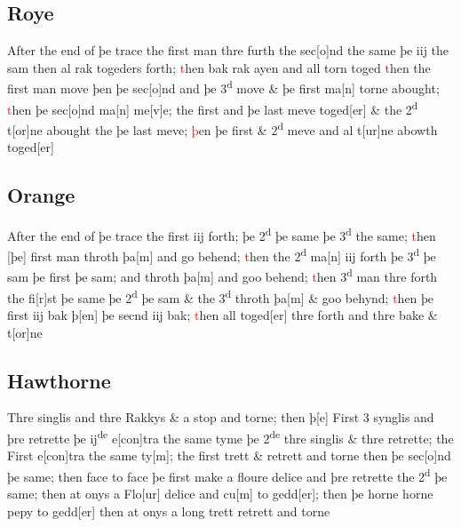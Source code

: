 \documentclass[12pt,letter]{article} %
\newcommand{\red}[1]{\textcolor{red}{#1}}
\newcommand{\srcpg}[1]{
    \noindent{
        \color{Gray}{\rule[0.5ex]{\linewidth}{1pt}~#1} 
        \\
    }
}
\begin{document}
\subsection{Roye}
After the end of þe trace the first man thre furth the sec{[}o{]}nd the
 same þe iij the sam then al rak togeders forth; \red{t}hen bak rak ayen and
all torn toged \red{t}hen the first man move þen þe sec{[}o{]}nd and þe
3\textsuperscript{d} move \& þe first ma{[}n{]} \srcpg{66} torne
abought; \red{t}hen þe sec{[}o{]}nd ma{[}n{]} me{[}v{]}e; the first and þe
last meve toged{[}er{]} \& the 2\textsuperscript{d} t{[}or{]}ne abought
the þe last meve; \red{þ}en þe first \& 2\textsuperscript{d} meve and al
t{[}ur{]}ne abowth toged{[}er{]}

\subsection{Orange}
After the end of þe trace the first iij forth; þe 2\textsuperscript{d}
þe same þe 3\textsuperscript{d} the same; \red{t}hen {[}þe{]} first man throth
þa{[}m{]} and go behend; \red{t}hen the 2\textsuperscript{d} ma{[}n{]} iij
forth þe 3\textsuperscript{d} þe sam þe first þe sam; and throth
þa{[}m{]} and goo behend; \red{t}hen 3\textsuperscript{d} man thre forth the 
fi{[}r{]}st þe same þe 2\textsuperscript{d} þe sam \& the
3\textsuperscript{d} throth þa{[}m{]} \& goo behynd; \red{t}hen þe first iij
bak þ{[}en{]} þe secnd iij bak; \red{t}hen all toged{[}er{]} thre forth and
thre bake \& t{[}or{]}ne

\subsection{Hawthorne}
\srcpg{67} Thre singlis and thre Rakkys \& a
stop and torne; then þ{[}e{]} First 3 synglis and þre retrette þe
ij\textsuperscript{de} e{[}con{]}tra the same tyme þe
2\textsuperscript{de} thre singlis \& thre retrette; the First
e{[}con{]}tra the same ty{[}m{]}; the first trett \& retrett and torne
then þe sec{[}o{]}nd þe same; then face to face þe first make a floure
delice and þre retrette the 2\textsuperscript{d} þe same; then at onys a
Flo{[}ur{]} delice and cu{[}m{]} to gedd{[}er{]}; then þe horne horne
pepy to gedd{[}er{]} then at onys a long trett retrett and torne
\end{document}
